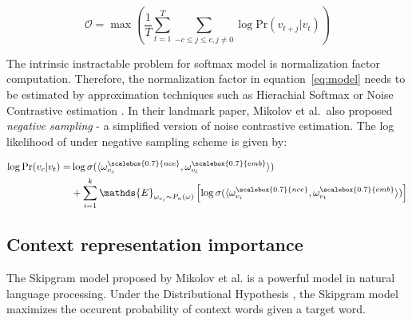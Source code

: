 \documentclass[letterpaper]{article}
\begin{document}
            \begin{equation}
                \label{eq:avgloglikelihood}
                \mathcal{O} = \max \left( \frac{1}{T} \sum_{t=1}^{T} \sum_{-c \leq j \leq c, j \neq 0} \log \mbox{Pr} (v_{t+j} | v_t) \right)
            \end{equation}

            The intrinsic instractable problem for softmax model is normalization factor computation. 
            Therefore, the normalization factor in equation~\ref{eq:model} needs to be estimated by 
            approximation techniques such as Hierachial Softmax \cite{hs} or Noise Contrastive estimation
            \cite{nce}. In their landmark paper, Mikolov et al.\  also proposed \emph{negative sampling} - a 
            simplified version of noise contrastive estimation. The log likelihood of under negative
            sampling scheme is given by:

            \begin{equation}
                \label{eq:objneg}
                \begin{aligned}
                \log \mbox{Pr} (v_c | v_t) = & \log \sigma( \langle \omega^{\scalebox{0.7}{nce}}_{v_c} , \omega^{\scalebox{0.7}{emb}}_{v_t} \rangle ) \\
                & + \sum_{i=1}^{k} \mathds{E}_{\omega_{v_i} \sim P_n(\omega)} \left[ \log \sigma( \langle \omega^{\scalebox{0.7}{nce}}_{v_i} , \omega^{\scalebox{0.7}{emb}}_{v_t} \rangle) \right]
                \end{aligned}
            \end{equation}
            

        \subsection{Context representation importance}
            The Skipgram model proposed by Mikolov et al. \cite{skipgram} is a powerful model 
            in natural language processing. Under the Distributional Hypothesis \cite{disthyp},
            the Skipgram model maximizes the occurent probability of context words given a target
            word.  
\end{document}
